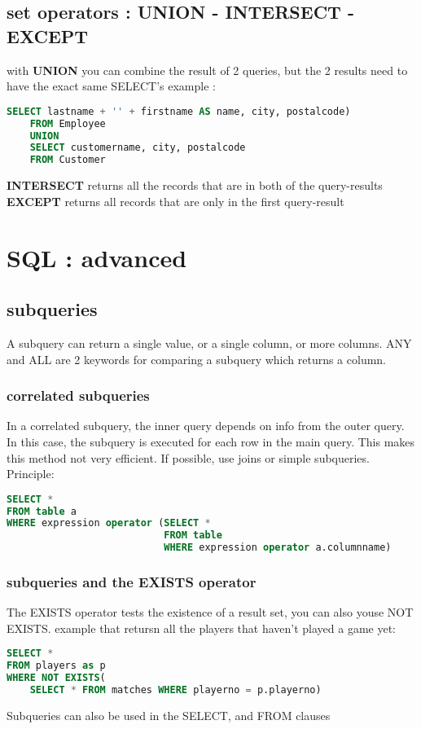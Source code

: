 \documentclass{report}
\begin{document}
	\section{set operators : UNION - INTERSECT - EXCEPT}
	with \textbf{UNION} you can combine the result of 2 queries, but the 2 results need to have the exact same SELECT's
	example : 
	\begin{lstlisting}[language=SQL]
	SELECT lastname + '' + firstname AS name, city, postalcode)
	FROM Employee
	UNION
	SELECT customername, city, postalcode
	FROM Customer\end{lstlisting}
	\textbf{INTERSECT} returns all the records that are in both of the query-results
	\textbf{EXCEPT} returns all records that are only in the first query-result
	
	\chapter{SQL : advanced}
	\section{subqueries}
	A subquery can return a single value, or a single column, or more columns.
	ANY and ALL are 2 keywords for comparing a subquery which returns a column.
	\subsection{correlated subqueries}
	In a correlated subquery, the inner query depends on info from the outer query. In this case, the subquery is executed for each row in the main query. This makes this method not very efficient. If possible, use joins or simple subqueries. 
	Principle: 
	\begin{lstlisting}[language=SQL]
SELECT * 
FROM table a
WHERE expression operator (SELECT *
						   FROM table 
						   WHERE expression operator a.columnname)\end{lstlisting}
	\subsection{subqueries and the EXISTS operator}
	The EXISTS operator tests the existence of a result set, you can also youse NOT EXISTS. example that retursn all the players that haven't played a game yet: 
	\begin{lstlisting}[language=SQL]
SELECT * 
FROM players as p
WHERE NOT EXISTS(
	SELECT * FROM matches WHERE playerno = p.playerno)\end{lstlisting}
	Subqueries can also be used in the SELECT, and FROM clauses
	\pagebreak
\end{document}
